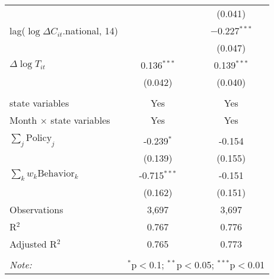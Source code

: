\begin{tabular}{@{\extracolsep{1pt}}lcc}
  &  & (0.041) \\ 
  lag($\log \Delta C_{it}$.national, 14) &  & $-$0.227$^{***}$ \\ 
  &  & (0.047) \\ 
  $\Delta \log T_{it}$ & 0.136$^{***}$ & 0.139$^{***}$ \\ 
  & (0.042) & (0.040) \\ 
 \hline \\[-1.8ex] 
state variables & Yes & Yes \\ 
Month $\times$ state variables & Yes & Yes \\ 
\hline \\[-1.8ex] 
$\sum_j \mathrm{Policy}_j$ & -0.239$^{*}$ & -0.154 \\ 
 & (0.139) & (0.155) \\ 
$\sum_k w_k \mathrm{Behavior}_k$ & -0.715$^{***}$ & -0.151 \\ 
 & (0.162) & (0.151) \\ 
Observations & 3,697 & 3,697 \\ 
R$^{2}$ & 0.767 & 0.776 \\ 
Adjusted R$^{2}$ & 0.765 & 0.773 \\ 
\hline 
\hline \\[-1.8ex] 
\textit{Note:}  & \multicolumn{2}{r}{$^{*}$p$<$0.1; $^{**}$p$<$0.05; $^{***}$p$<$0.01} \\ 
\end{tabular} 